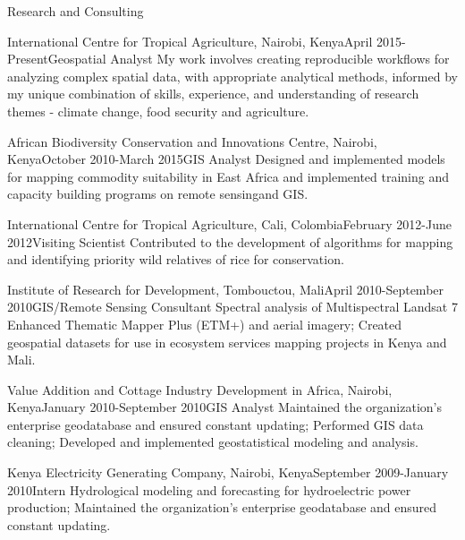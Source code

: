 \documentclass{resume} %
\begin{document}
\begin{rSection}{Research and Consulting}
\begin{pSubsection}{International Centre for Tropical Agriculture, }{Nairobi, Kenya}{April 2015-Present}{Geospatial Analyst}
{My work involves creating reproducible workflows for analyzing complex spatial data, with appropriate analytical methods, informed by my unique combination of skills, experience, and understanding of research themes - climate change, food security and agriculture.}
\end{pSubsection}

\begin{pSubsection}{African Biodiversity Conservation and Innovations Centre, }{Nairobi, Kenya}{October 2010-March 2015}{GIS Analyst}
{Designed and implemented models for mapping commodity suitability in East Africa and implemented training and capacity building programs on remote sensingand GIS.}
\end{pSubsection}


\begin{pSubsection}{International Centre for Tropical Agriculture, }{Cali, Colombia}{February 2012-June 2012}{Visiting Scientist}
{Contributed to the development of algorithms for mapping and identifying priority wild relatives of rice for conservation.}
\end{pSubsection}

\begin{pSubsection}{Institute of Research for Development, }{Tombouctou, Mali}{April 2010-September 2010}{GIS/Remote Sensing Consultant}
{Spectral analysis of Multispectral Landsat 7 Enhanced Thematic Mapper Plus (ETM+) and aerial imagery; Created geospatial datasets for use in ecosystem services mapping projects in Kenya and Mali.}
\end{pSubsection}

\begin{pSubsection}{Value Addition and Cottage Industry Development in Africa, }{Nairobi, Kenya}{January 2010-September 2010}{GIS Analyst}
{Maintained the organization's enterprise geodatabase and ensured constant updating; Performed GIS data cleaning; Developed and implemented geostatistical modeling and analysis.}
\end{pSubsection}

\begin{pSubsection}{Kenya Electricity Generating Company, }{Nairobi, Kenya}{September 2009-January 2010}{Intern}
{Hydrological modeling and forecasting for hydroelectric power production; Maintained the organization's enterprise geodatabase and ensured constant updating.}
\end{pSubsection}


\end{rSection}
\end{document}
